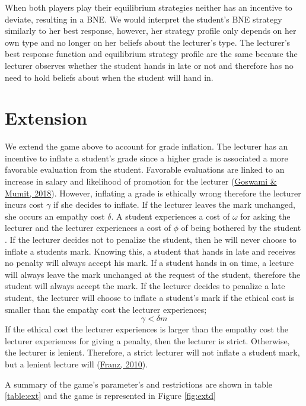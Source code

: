 \documentclass[11pt,preprint, authoryear]{elsarticle}
\numberwithin{equation}{section}
\numberwithin{figure}{section}
\numberwithin{table}{section}
\begin{document}
When both players play their equilibrium strategies neither has an
incentive to deviate, resulting in a BNE. We would interpret the
student's BNE strategy similarly to her best response, however, her
strategy profile only depends on her own type and no longer on her
beliefs about the lecturer's type. The lecturer's best response function
and equilibrium strategy profile are the same because the lecturer
observes whether the student hands in late or not and therefore has no
need to hold beliefs about when the student will hand in.

\hypertarget{extension}{%
\section{\texorpdfstring{Extension
\label{extension}}{Extension }}\label{extension}}

We extend the game above to account for grade inflation. The lecturer
has an incentive to inflate a student's grade since a higher grade is
associated a more favorable evaluation from the student. Favorable
evaluations are linked to an increase in salary and likelihood of
promotion for the lecturer (\protect\hyperlink{ref-2018grades}{Goswami
\& Mumit, 2018}). However, inflating a grade is ethically wrong
therefore the lecturer incurs cost \(\gamma\) if she decides to inflate.
If the lecturer leaves the mark unchanged, she occurs an empathy cost
\(\delta\). A student experiences a cost of \(\omega\) for asking the
lecturer and the lecturer experiences a cost of \(\phi\) of being
bothered by the student . If the lecturer decides not to penalize the
student, then he will never choose to inflate a students mark. Knowing
this, a student that hands in late and receives no penalty will always
accept his mark. If a student hands in on time, a lecture will always
leave the mark unchanged at the request of the student, therefore the
student will always accept the mark. If the lecturer decides to penalize
a late student, the lecturer will choose to inflate a student's mark if
the ethical cost is smaller than the empathy cost the lecturer
experiences;\\
\[\gamma < \delta m \] If the ethical cost the lecturer experiences is
larger than the empathy cost the lecturer experiences for giving a
penalty, then the lecturer is strict. Otherwise, the lecturer is
lenient. Therefore, a strict lecturer will not inflate a student mark,
but a lenient lecture will (\protect\hyperlink{ref-2010grade}{Franz,
2010}).

A summary of the game's parameter's and restrictions are shown in table
\ref{table:ext} and the game is represented in Figure \ref{fig:extd}
\end{document}
